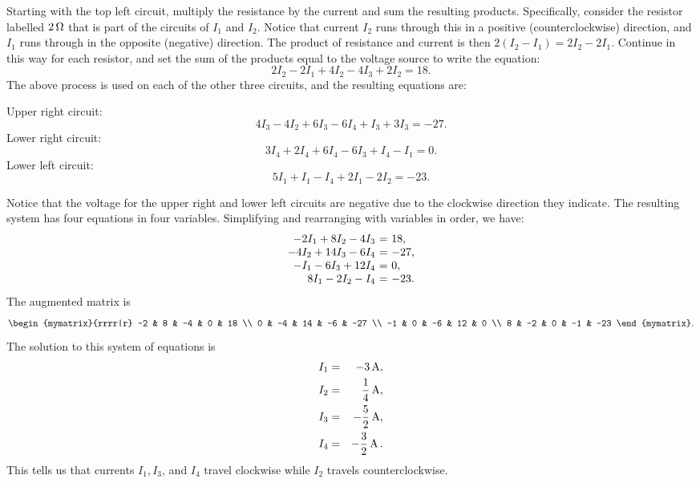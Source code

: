 \begin{solution}
  Starting with the top left circuit, multiply the resistance by the
  current and sum the resulting products. Specifically, consider the
  resistor labelled $2 \ohm$ that is part of the circuits of $I_1$ and
  $I_2$. Notice that current $I_2$ runs through this in a positive
  (counterclockwise) direction, and $I_1$ runs through in the opposite
  (negative) direction. The product of resistance and current is then
  $2 (I_2 - I_1) = 2I_2 - 2I_1$.  Continue in this way for each
  resistor, and set the sum of the products equal to the voltage
  source to write the equation:
  \begin{equation*}
    2I_2-2I_1+4I_2-4I_3+2I_2=18.
  \end{equation*}
  The above process is used on each of the other three circuits, and
  the resulting equations are:

  \noindent
  Upper right circuit:
  \begin{equation*}
    4I_3 - 4I_2 + 6I_3 - 6I_4 + I_3 + 3I_3 = -27.
  \end{equation*}
  Lower right circuit:
  \begin{equation*}
    3I_4 + 2I_4 + 6I_4 - 6I_3 + I_4 - I_1 = 0.
  \end{equation*}
  Lower left circuit:
  \begin{equation*}
    5I_1+I_1-I_4+2I_1-2I_2=-23.
  \end{equation*}

  Notice that the voltage for the upper right and lower left circuits
  are negative due to the clockwise direction they indicate. The
  resulting system has four equations in four variables.  Simplifying
  and rearranging with variables in order, we have:
  \begin{equation*}
    \begin{array}{r@{~}c@{~}l}
      -2I_1+8I_2-4I_3&=&18, \\
      - 4I_2 + 14I_3 - 6I_4 &=& -27, \\
      -I_1 - 6I_3 + 12I_4 &=& 0, \\
      8I_1-2I_2 - I_4 &=& -23.
    \end{array}
  \end{equation*}
  The augmented matrix is
  \begin{equation*}
    \begin{mymatrix}{rrrr|r}
      -2 & 8 & -4 & 0 & 18 \\
      0 & -4 & 14 & -6 & -27 \\
      -1 & 0 & -6 & 12 & 0 \\
      8 & -2 & 0 & -1 & -23
    \end{mymatrix}.
  \end{equation*}
  The solution to this system of equations is
  \begin{eqnarray*}
    I_1 &=& -3 \amp, \\
    I_2 &=& \frac{1}{4} \amp, \\
    I_3 &=& -\frac{5}{2} \amp, \\
    I_4 &=& -\frac{3}{2} \amp.
  \end{eqnarray*}
  This tells us that currents $I_1, I_3$, and $I_4$ travel clockwise
  while $I_2$ travels counterclockwise.
\end{solution}
